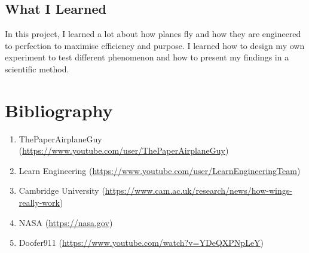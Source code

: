 \documentclass[12pt]{article}
\begin{document}
\subsection{What I Learned}
In this project, I learned a lot about how planes fly and how they are engineered to perfection to maximise efficiency and purpose. I learned how to design my own experiment to test different phenomenon and how to present my findings in a scientific method.
\section{Bibliography}
\begin{enumerate}
	\item ThePaperAirplaneGuy (\url{https://www.youtube.com/user/ThePaperAirplaneGuy})
	\item Learn Engineering (\url{https://www.youtube.com/user/LearnEngineeringTeam})
	\item Cambridge University (\url{https://www.cam.ac.uk/research/news/how-wings-really-work})
	\item NASA (\url{https://nasa.gov})
	\item Doofer911 (\url{https://www.youtube.com/watch?v=YDeQXPNpLeY})
\end{enumerate}
\end{document}
